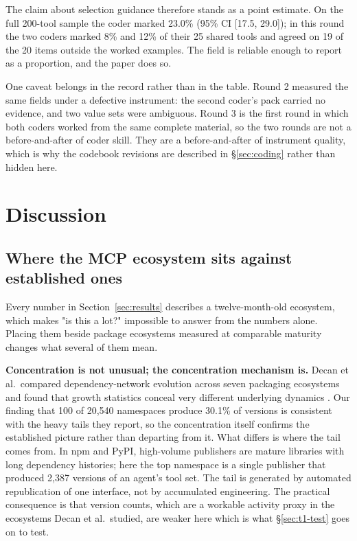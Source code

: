 \documentclass[a4paper,fleqn]{cas-dc}
\begin{document}
The claim about selection guidance therefore stands as a point estimate. On the
full 200-tool sample the coder marked 23.0\% (95\% CI [17.5, 29.0]); in this
round the two coders marked 8\% and 12\% of their 25 shared tools and agreed on
19 of the 20 items outside the worked examples. The field is reliable enough to
report as a proportion, and the paper does so.

One caveat belongs in the record rather than in the table. Round 2 measured the
same fields under a defective instrument: the second coder's pack carried no
evidence, and two value sets were ambiguous. Round 3 is the first round in
which both coders worked from the same complete material, so the two rounds are
not a before-and-after of coder skill. They are a before-and-after of instrument
quality, which is why the codebook revisions are described in \S\ref{sec:coding}
rather than hidden here.

\section{Discussion}\label{sec:discussion}

\subsection{Where the MCP ecosystem sits against established ones}

Every number in Section~\ref{sec:results} describes a twelve-month-old
ecosystem, which makes "is this a lot?" impossible to answer from the numbers
alone. Placing them beside package ecosystems measured at comparable maturity
changes what several of them mean.

\textbf{Concentration is not unusual; the concentration mechanism is.} Decan et
al.\ compared dependency-network evolution across seven packaging ecosystems and
found that growth statistics conceal very different underlying dynamics
\citep{decan2019}. Our finding that 100 of 20,540 namespaces produce 30.1\% of
versions is consistent with the heavy tails they report, so the concentration
itself confirms the established picture rather than departing from it. What
differs is where the tail comes from. In npm and PyPI, high-volume publishers
are mature libraries with long dependency histories; here the top namespace is a
single publisher that produced 2,387 versions of an agent's tool set. The tail
is generated by automated republication of one interface, not by accumulated
engineering. The practical consequence is that version counts, which are a
workable activity proxy in the ecosystems Decan et al.\ studied, are weaker here
which is what \S\ref{sec:t1-test} goes on to test.
\end{document}
